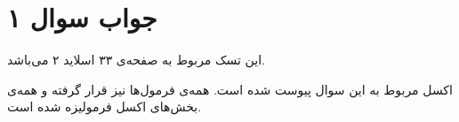 \section*{جواب سوال ۱}

این تسک مربوط به صفحه‌ی ۳۳ اسلاید ۲ می‌باشد.

اکسل مربوط به این سوال پیوست شده است. همه‌ی فرمول‌ها نیز قرار گرفته و همه‌ی بخش‌های اکسل فرمولیزه شده است.
